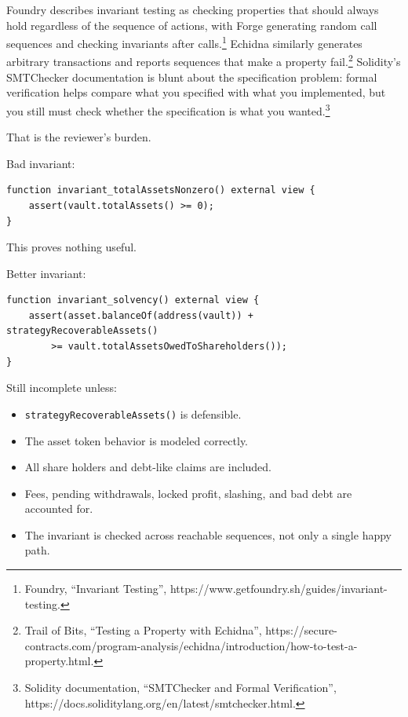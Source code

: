 Foundry describes invariant testing as checking properties that should
always hold regardless of the sequence of actions, with Forge generating
random call sequences and checking invariants after calls.\footnote{Foundry,
  ``Invariant Testing'',
  https://www.getfoundry.sh/guides/invariant-testing.} Echidna similarly
generates arbitrary transactions and reports sequences that make a
property fail.\footnote{Trail of Bits, ``Testing a Property with
  Echidna'',
  https://secure-contracts.com/program-analysis/echidna/introduction/how-to-test-a-property.html.}
Solidity's SMTChecker documentation is blunt about the specification
problem: formal verification helps compare what you specified with what
you implemented, but you still must check whether the specification is
what you wanted.\footnote{Solidity documentation, ``SMTChecker and
  Formal Verification'',
  https://docs.soliditylang.org/en/latest/smtchecker.html.}

That is the reviewer's burden.

Bad invariant:

\begin{lstlisting}
function invariant_totalAssetsNonzero() external view {
    assert(vault.totalAssets() >= 0);
}
\end{lstlisting}

This proves nothing useful.

Better invariant:

\begin{lstlisting}
function invariant_solvency() external view {
    assert(asset.balanceOf(address(vault)) + strategyRecoverableAssets()
        >= vault.totalAssetsOwedToShareholders());
}
\end{lstlisting}

Still incomplete unless:

\begin{itemize}
\tightlist
\item
  \passthrough{\lstinline!strategyRecoverableAssets()!} is defensible.
\item
  The asset token behavior is modeled correctly.
\item
  All share holders and debt-like claims are included.
\item
  Fees, pending withdrawals, locked profit, slashing, and bad debt are
  accounted for.
\item
  The invariant is checked across reachable sequences, not only a single
  happy path.
\end{itemize}

